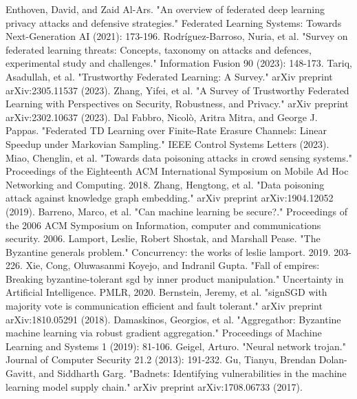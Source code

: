 \documentclass[conference]{IEEEtran}
\begin{document}
\begin{thebibliography}{00}
     Enthoven, David, and Zaid Al-Ars. "An overview of federated deep learning privacy attacks and defensive strategies." Federated Learning Systems: Towards Next-Generation AI (2021): 173-196.  
     Rodríguez-Barroso, Nuria, et al. "Survey on federated learning threats: Concepts, taxonomy on attacks and defences, experimental study and challenges." Information Fusion 90 (2023): 148-173.  
     Tariq, Asadullah, et al. "Trustworthy Federated Learning: A Survey." arXiv preprint arXiv:2305.11537 (2023).   
     Zhang, Yifei, et al. "A Survey of Trustworthy Federated Learning with Perspectives on Security, Robustness, and Privacy." arXiv preprint arXiv:2302.10637 (2023).  
     Dal Fabbro, Nicolò, Aritra Mitra, and George J. Pappas. "Federated TD Learning over Finite-Rate Erasure Channels: Linear Speedup under Markovian Sampling." IEEE Control Systems Letters (2023).  
     Miao, Chenglin, et al. "Towards data poisoning attacks in crowd sensing systems." Proceedings of the Eighteenth ACM International Symposium on Mobile Ad Hoc Networking and Computing. 2018.  
     Zhang, Hengtong, et al. "Data poisoning attack against knowledge graph embedding." arXiv preprint arXiv:1904.12052 (2019).   
     Barreno, Marco, et al. "Can machine learning be secure?." Proceedings of the 2006 ACM Symposium on Information, computer and communications security. 2006.  
     Lamport, Leslie, Robert Shostak, and Marshall Pease. "The Byzantine generals problem." Concurrency: the works of leslie lamport. 2019. 203-226.   
     Xie, Cong, Oluwasanmi Koyejo, and Indranil Gupta. "Fall of empires: Breaking byzantine-tolerant sgd by inner product manipulation." Uncertainty in Artificial Intelligence. PMLR, 2020.  
     Bernstein, Jeremy, et al. "signSGD with majority vote is communication efficient and fault tolerant." arXiv preprint arXiv:1810.05291 (2018).  
     Damaskinos, Georgios, et al. "Aggregathor: Byzantine machine learning via robust gradient aggregation." Proceedings of Machine Learning and Systems 1 (2019): 81-106.   
     Geigel, Arturo. "Neural network trojan." Journal of Computer Security 21.2 (2013): 191-232.   
     Gu, Tianyu, Brendan Dolan-Gavitt, and Siddharth Garg. "Badnets: Identifying vulnerabilities in the machine learning model supply chain." arXiv preprint arXiv:1708.06733 (2017).











\end{thebibliography}
\end{document}
